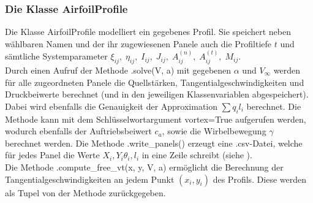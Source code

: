 \subsubsection{Die Klasse AirfoilProfile}
Die Klasse AirfoilProfile modelliert ein gegebenes Profil. Sie speichert neben wählbaren Namen und der ihr zugewiesenen Panele auch die Profiltiefe $t$ und sämtliche Systemparameter $\xi_{ij}, \; \eta_{ij}, \; I_{ij}, \; J_{ij}, \; A_{ij}^{(n)}, \;A_{ij}^{(t)}, \;M_{ij}$. \\
Durch einen Aufruf der Methode .solve(V, a) mit gegebenen $\alpha $ und $V_{\infty}$ werden für alle zugeordneten Panele die Quellstärken, Tangentialgeschwindigkeiten und Druckbeiwerte berechnet (und in den jeweiligen Klassenvariablen abgespeichert). Dabei wird ebenfalls die Genauigkeit der Approximation $\sum q_i l_i$ berechnet. Die Methode kann mit dem Schlüsselwortargument vortex=True aufgerufen werden, wodurch ebenfalls der Auftriebsbeiwert $c_a$, sowie die Wirbelbewegung $\gamma$ \\ berechnet werden.
Die Methode .write\_panels() erzeugt eine .csv-Datei, welche für jedes Panel die Werte $X_i, Y_i \theta_i, l_i$ in eine Zeile schreibt (siehe ). \\
Die Methode .compute\_free\_vt(x, y, V, a) ermöglicht die Berechnung der Tangentialgeschwindigkeiten an jedem Punkt $(x_i, y_i)$ des Profils. Diese werden als Tupel von der Methode zurückgegeben.
